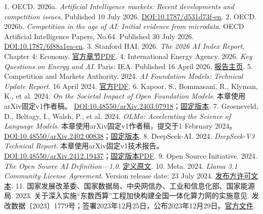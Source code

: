 \documentclass[UTF8,fontset=windows,12pt,a4paper,oneside,openany]{ctexbook}
\begin{document}
1. OECD. 2026a. \emph{Artificial Intelligence markets: Recent developments and competition issues}. Published 10 July 2026. \href{https://doi.org/10.1787/d531d73f-en}{DOI:10.1787/d531d73f-en}.
2. OECD. 2026b. \emph{Competition in the age of AI: Initial evidence from microdata}. OECD Artificial Intelligence Papers, No.64. Published 30 July 2026. \href{https://doi.org/10.1787/6f88a1ea-en}{DOI:10.1787/6f88a1ea-en}.
3. Stanford HAI. 2026. \emph{The 2026 AI Index Report}, Chapter 4: Economy. \href{https://hai.stanford.edu/assets/files/ai_index_report_2026_chapter_4_economy.pdf}{官方章节PDF}.
4. International Energy Agency. 2026. \emph{Key Questions on Energy and AI}. Paris: IEA. Published 16 April 2026. \href{https://www.iea.org/reports/key-questions-on-energy-and-ai}{报告主页}.
5. Competition and Markets Authority. 2024. \emph{AI Foundation Models: Technical Update Report}. 16 April 2024. \href{https://assets.publishing.service.gov.uk/media/661e5a4c7469198185bd3d62/AI_Foundation_Models_technical_update_report.pdf}{官方PDF}.
6. Kapoor, S., Bommasani, R., Klyman, K., et al. 2024. \emph{On the Societal Impact of Open Foundation Models}. 本章使用arXiv固定v1作者稿。 \href{https://doi.org/10.48550/arXiv.2403.07918}{DOI:10.48550/arXiv.2403.07918}；\href{https://arxiv.org/html/2403.07918v1}{固定版本}.
7. Groeneveld, D., Beltagy, I., Walsh, P., et al. 2024. \emph{OLMo: Accelerating the Science of Language Models}. 本章使用arXiv固定v1作者稿，提交于1 February 2024。 \href{https://doi.org/10.48550/arXiv.2402.00838}{DOI:10.48550/arXiv.2402.00838}；\href{https://arxiv.org/html/2402.00838v1}{固定版本}.
8. DeepSeek-AI. 2024. \emph{DeepSeek-V3 Technical Report}. 本章使用arXiv固定v1技术报告。 \href{https://doi.org/10.48550/arXiv.2412.19437}{DOI:10.48550/arXiv.2412.19437}；\href{https://arxiv.org/pdf/2412.19437v1}{固定版本PDF}.
9. Open Source Initiative. 2024. \emph{The Open Source AI Definition—1.0}. \href{https://opensource.org/ai/open-source-ai-definition}{定义原文}.
10. Meta. 2024. \emph{Llama 3.1 Community License Agreement}. Version release date: 23 July 2024. \href{https://raw.githubusercontent.com/meta-llama/llama-models/main/models/llama3_1/LICENSE}{发布方许可文本}.
11. 国家发展改革委、国家数据局、中央网信办、工业和信息化部、国家能源局. 2023. 关于深入实施“东数西算”工程加快构建全国一体化算力网的实施意见. 发改数据〔2023〕1779号；签署2023年12月25日，公布2023年12月29日。\href{https://www.ndrc.gov.cn/xxgk/zcfb/tz/202312/t20231229_1363000.html}{官方文件}.
\end{document}

